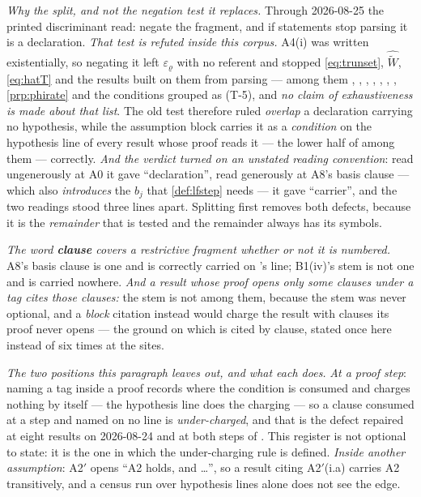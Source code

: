 \emph{Why the split, and not the negation test it replaces.} Through 2026-08-25 the printed discriminant
read: negate the fragment, and if statements stop parsing it is a declaration. \emph{That test is
refuted inside this corpus.} A4(i) was written existentially, so negating it left $\varepsilon_\varrho$
with no referent and stopped \eqref{eq:trunset}, $\widehat{\widetilde W}$, \eqref{eq:hatT} and the
results built on them from parsing --- among them ,
, , ,
, , ,
\cref{prp:phirate} and the conditions grouped as \textup{(T-5)}, and \emph{no claim of exhaustiveness is
made about that list}. The old test therefore ruled \emph{overlap} a declaration carrying no hypothesis,
while the assumption block carries it as a \emph{condition} on the hypothesis line of every result whose
proof reads it --- the lower half of  among them --- correctly.
\emph{And the verdict turned on an unstated reading convention}: read ungenerously at
A0 it gave ``declaration'', read generously at A8's basis clause --- which also \emph{introduces} the
$b_j$ that \cref{def:lfstep} needs --- it gave ``carrier'', and the two readings stood three lines apart.
Splitting first removes both defects, because it is the \emph{remainder} that is tested and the
remainder always has its symbols.

\emph{The word \textbf{clause} covers a restrictive fragment whether or not it is numbered.} A8's basis
clause is one and is correctly carried on 's line; B1(iv)'s stem is not one and is
carried nowhere. \emph{And a result whose proof opens only some clauses under a tag cites those clauses:}
the stem is not among them, because the stem was never optional, and a \emph{block} citation instead
would charge the result with clauses its proof never opens --- the ground on which
 is cited by clause, stated once here instead of six times at the sites.

\emph{The two positions this paragraph leaves out, and what each does.} \emph{At a proof step}: naming a
tag inside a proof records where the condition is consumed and charges nothing by itself --- the
hypothesis line does the charging --- so a clause consumed at a step and named on no line is
\emph{under-charged}, and that is the defect repaired at eight results on 2026-08-24 and at both steps of
. This register is not optional to state: it is the one in which the under-charging
rule is defined. \emph{Inside another assumption}: A2$'$ opens ``A2 holds, and \dots'', so a result
citing A2$'$(i.a) carries A2 transitively, and a census run over hypothesis lines alone does not see the
edge.

